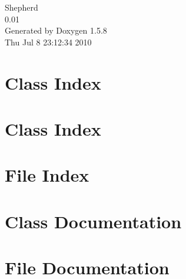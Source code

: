 \documentclass[a4paper]{book}
\begin{document}
\begin{titlepage}
\vspace*{7cm}
\begin{center}
{\Large Shepherd \\[1ex]\large 0.01 }\\
\vspace*{1cm}
{\large Generated by Doxygen 1.5.8}\\
\vspace*{0.5cm}
{\small Thu Jul 8 23:12:34 2010}\\
\end{center}
\end{titlepage}
\clearemptydoublepage
{}
\tableofcontents
\clearemptydoublepage
{}
\chapter{Class Index}

\chapter{Class Index}

\chapter{File Index}

\chapter{Class Documentation}








\chapter{File Documentation}














\printindex
\end{document}
